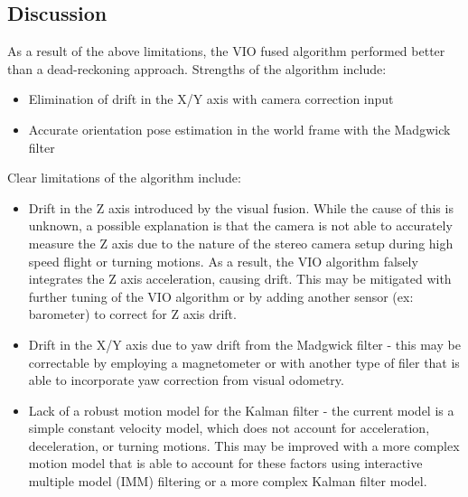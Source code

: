 \documentclass[bare_jrnl_transmag]{subfiles}
\begin{document}
\subsection{Discussion}
As a result of the above limitations, the VIO fused algorithm performed better than a dead-reckoning approach. Strengths of the algorithm include:
\begin{itemize}
    \item Elimination of drift in the X/Y axis with camera correction input
    \item Accurate orientation pose estimation in the world frame with the Madgwick filter 
\end{itemize}

Clear limitations of the algorithm include:
\begin{itemize}
    \item Drift in the Z axis introduced by the visual fusion. While the cause of this is unknown, a possible explanation is that the camera is not able to accurately measure the Z axis due to the nature of the stereo camera setup during high speed flight or turning motions. As a result, the VIO algorithm falsely integrates the Z axis acceleration, causing drift. This may be mitigated with further tuning of the VIO algorithm or by adding another sensor (ex: barometer) to correct for Z axis drift.
    \item Drift in the X/Y axis due to yaw drift from the Madgwick filter - this may be correctable by employing a magnetometer or with another type of filer that is able to incorporate yaw correction from visual odometry. 
    \item Lack of a robust motion model for the Kalman filter - the current model is a simple constant velocity model, which does not account for acceleration, deceleration, or turning motions. This may be improved with a more complex motion model that is able to account for these factors using interactive multiple model (IMM) filtering or a more complex Kalman filter model.
\end{itemize}
\end{document}
